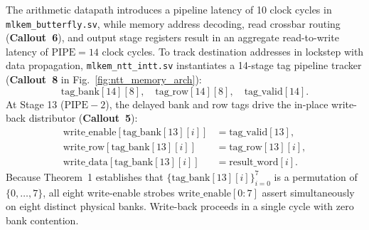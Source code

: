 The arithmetic datapath introduces a pipeline latency of 10 clock cycles in \texttt{mlkem\_butterfly.sv}, while memory address decoding, read crossbar routing (\textbf{Callout~6}), and output stage registers result in an aggregate read-to-write latency of $\text{PIPE} = 14$ clock cycles. To track destination addresses in lockstep with data propagation, \texttt{mlkem\_ntt\_intt.sv} instantiates a 14-stage tag pipeline tracker (\textbf{Callout~8} in Fig.~\ref{fig:ntt_memory_arch}):
\begin{equation}
\label{eq:tag_tracker}
\text{tag\_bank}[14][8], \quad \text{tag\_row}[14][8], \quad \text{tag\_valid}[14].
\end{equation}
At Stage 13 ($\text{PIPE}-2$), the delayed bank and row tags drive the in-place write-back distributor (\textbf{Callout~5}):
\begin{align}
\text{write\_enable}[\text{tag\_bank}[13][i]] &= \text{tag\_valid}[13], \label{eq:wb_en} \\
\text{write\_row}[\text{tag\_bank}[13][i]] &= \text{tag\_row}[13][i], \label{eq:wb_row} \\
\text{write\_data}[\text{tag\_bank}[13][i]] &= \text{result\_word}[i]. \label{eq:wb_data}
\end{align}
Because Theorem~1 establishes that $\{\text{tag\_bank}[13][i]\}_{i=0}^7$ is a permutation of $\{0, \dots, 7\}$, all eight write-enable strobes $\text{write\_enable}[0:7]$ assert simultaneously on eight distinct physical banks. Write-back proceeds in a single cycle with zero bank contention.

